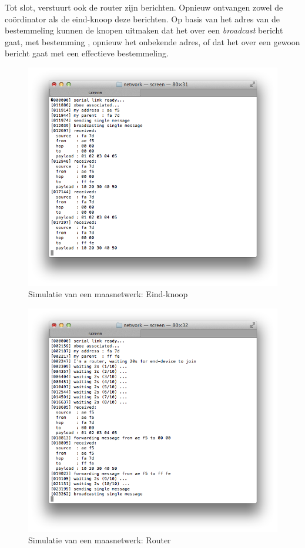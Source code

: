 Tot slot, verstuurt ook de router zijn berichten. Opnieuw ontvangen zowel de
co\"ordinator als de eind-knoop deze berichten. Op basis van het adres van de
bestemmeling kunnen de knopen uitmaken dat het over een \emph{broadcast}
bericht gaat, met bestemming , opnieuw het onbekende adres, of dat
het over een gewoon bericht gaat met een effectieve bestemmeling.

\begin{figure}[ht]
  \centering
  \includegraphics[width=.9\linewidth]{../src/demo/network/end-device.png}
  \caption{Simulatie van een maasnetwerk: Eind-knoop}
  \label{fig:virtual-mesh-end-device}
\end{figure}

\begin{figure}[ht]
  \centering
  \includegraphics[width=.9\linewidth]{../src/demo/network/router.png}
  \caption{Simulatie van een maasnetwerk: Router}
  \label{fig:virtual-mesh-router}
\end{figure}

